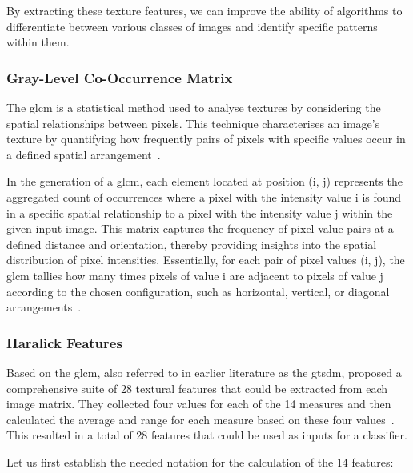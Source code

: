 By extracting these texture features, we can improve the ability of algorithms to differentiate between various classes of images and identify specific patterns within them. 

\subsubsection{Gray-Level Co-Occurrence Matrix}
The \acf{glcm} is a statistical method used to analyse textures by considering the spatial relationships between pixels. This technique characterises an image's texture by quantifying how frequently pairs of pixels with specific values occur in a defined spatial arrangement~\cite{zulpe_glcm_2012}.

In the generation of a \ac{glcm}, each element located at position (i, j) represents the aggregated count of occurrences where a pixel with the intensity value i is found in a specific spatial relationship to a pixel with the intensity value j within the given input image. This matrix captures the frequency of pixel value pairs at a defined distance and orientation, thereby providing insights into the spatial distribution of pixel intensities. Essentially, for each pair of pixel values (i, j), the \ac{glcm} tallies how many times pixels of value i are adjacent to pixels of value j according to the chosen configuration, such as horizontal, vertical, or diagonal arrangements~\cite{zulpe_glcm_2012}.

\subsubsection{Haralick Features}
Based on the \ac{glcm}, also referred to in earlier literature as the \acf{gtsdm}, \textcite{haralick_textural_1973} proposed a comprehensive suite of 28 textural features that could be extracted from each image matrix. They collected four values for each of the 14 measures and then calculated the average and range for each measure based on these four values~\cite{haralick_textural_1973, zulpe_glcm_2012}. This resulted in a total of 28 features that could be used as inputs for a classifier. 

Let us first establish the needed notation for the calculation of the 14 features:

